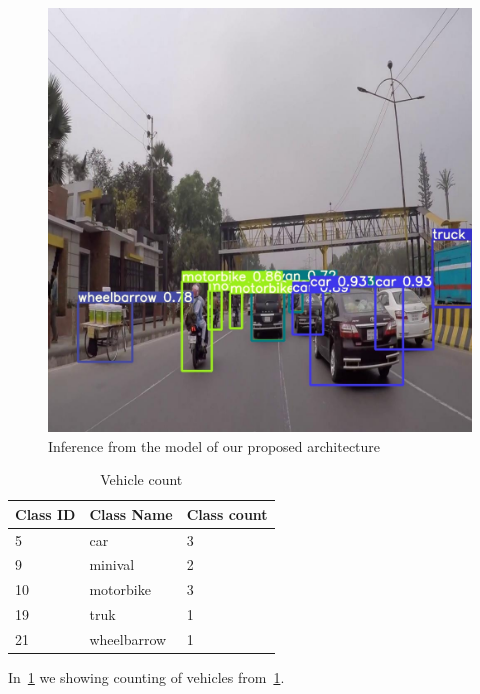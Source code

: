 \begin{figure}[h]
    \centering
    \includegraphics[max width=\textwidth]{images/ours/Asraf_51_jpg.rf.0e3516baf7509bc2c4a4aa8deea494c2.jpg}
   \caption[Inference Sample]{ Inference from the model of our proposed architecture}
    \label{fig:inference23}
\end{figure}

\begin{table}[!h]
  \centering
  \caption[Vehicle Count]{Vehicle count}
  \label{tab:vehicle_count}
  {\renewcommand{\arraystretch}{1.1}
    \begin{tabular}{p{2cm} p{3cm} p{3cm}}
          \toprule
            Class ID & Class Name & Class count \\
          \hline
            5 & car & 3 \\
            9 & minival & 2 \\
            10 & motorbike & 3 \\
            19 & truk & 1 \\
            21 & wheelbarrow & 1 \\
          \bottomrule
    \end{tabular}
  }
\end{table}

In~\ref{tab:vehicle_count} we showing counting of vehicles from~\ref{fig:inference23}.



